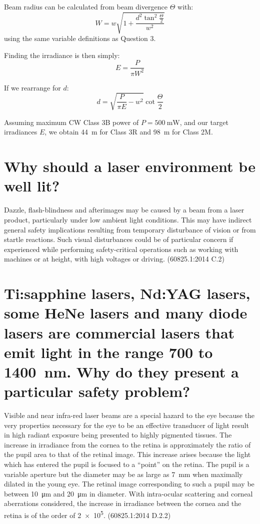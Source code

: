 \documentclass[a4paper]{scrartcl}
\begin{document}
Beam radius can be calculated from beam divergence \(\Theta\) with:
\[W = w \sqrt{1 + \frac{d^2 \tan^2 \frac{\Theta}{2}}{w^2}}\]
using the same variable definitions as Question 3.

Finding the irradiance is then simply:
\[E = \frac{P}{\pi W^2}\]

If we rearrange for \(d\):
\[d = \sqrt{\frac{P}{\pi E} - w^2} \cot \frac{\Theta}{2}\]

Assuming maximum CW Class 3B power of \(P = \SI{500}{\milli\watt}\), and our target irradiances \(E\), we obtain \SI{44}{\metre} for Class 3R and \SI{98}{\metre} for Class 2M.

\section{Why should a laser environment be well lit?}
Dazzle, flash-blindness and afterimages may be caused by a beam from a laser product, particularly under low ambient light conditions. This may have indirect general safety implications resulting from temporary disturbance of vision or from startle reactions. Such visual disturbances could be of particular concern if experienced while performing safety-critical operations such as working with machines or at height, with high voltages or driving. (60825.1:2014 C.2)

\section{Ti:sapphine lasers, Nd:YAG lasers, some HeNe lasers and many diode lasers are commercial lasers that emit light in the range \SI{700}{} to \SI{1400}{\nano\metre}. Why do they present a particular safety problem?}
Visible and near infra-red laser beams are a special hazard to the eye because the very properties necessary for the eye to be an effective transducer of light result in high radiant exposure being presented to highly pigmented tissues. The increase in irradiance from the cornea to the retina is approximately the ratio of the pupil area to that of the retinal image. This increase arises because the light which has entered the pupil is focused to a ``point'' on the retina. The pupil is a variable aperture but the diameter may be as large as \SI{7}{\milli\metre} when maximally dilated in the young eye. The retinal image corresponding to such a pupil may be between \SI{10}{\micro\metre} and \SI{20}{\micro\metre} in diameter. With intra-ocular scattering and corneal aberrations considered, the increase in irradiance between the cornea and the retina is of the order of \SI{2e5}{}. (60825.1:2014 D.2.2)
\end{document}
